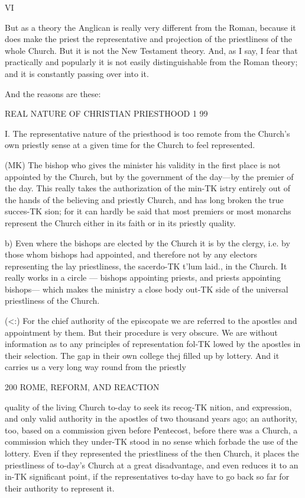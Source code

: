 \documentclass[12pt,a5paper,twoside]{book}
\begin{document}
{VI 

But as a theory the Anglican is really very different 
from the Roman, because it does make the priest the 
representative and projection of the priestliness of the 
whole Church. But it is not the New Testament 
theory. And, as I say, I fear that practically and 
popularly it is not easily distinguishable from the 
Roman theory; and it is constantly passing over into it. 

And the reasons are these: 



REAL NATURE OF CHRISTIAN PRIESTHOOD 1 99 

I. The representative nature of the priesthood is 
too remote from the Church's own priestly sense at a 
given time for the Church to feel represented. 

(MK) The bishop who gives the minister his validity 
in the first place is not appointed by the Church, but 
by the government of the day---by the premier of the 
day. This really takes the authorization of the min-TK
istry entirely out of the hands of the believing and 
priestly Church, and has long broken the true succes-TK
sion; for it can hardly be said that most premiers or 
most monarchs represent the Church either in its faith 
or in its priestly quality. 

{b) Even where the bishops are elected by the 
Church it is by the clergy, i.e. by those whom 
bishops had appointed, and therefore not by any 
electors representing the lay priestliness, the sacerdo-TK
t'lum laid., in the Church. It really works in a circle 
— bishops appointing priests, and priests appointing 
bishops— which makes the ministry a close body out-TK
side of the universal priestliness of the Church. 

(<:) For the chief authority of the episcopate we are 
referred to the apostles and appointment by them. 
But their procedure is very obscure. We are without 
information as to any principles of representation fol-TK
lowed by the apostles in their selection. The gap in 
their own college thej filled up by lottery. And it 
carries us a very long way round from the priestly 



200 ROME, REFORM, AND REACTION 

quality of the living Church to-day to seek its recog-TK
nition, and expression, and only valid authority in the 
apostles of two thousand years ago; an authority, too, 
based on a commission given before Pentecost, before 
there was a Church, a commission which they under-TK
stood in no sense which forbade the use of the lottery. 
Even if they represented the priestliness of the then 
Church, it places the priestliness of to-day's Church at 
a great disadvantage, and even reduces it to an in-TK
significant point, if the representatives to-day have to 
go back so far for their authority to represent it. 

}}
\end{document}
